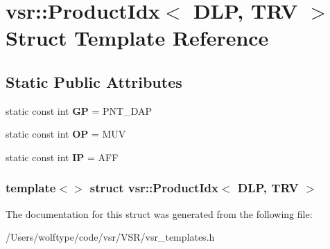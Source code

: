 \hypertarget{structvsr_1_1_product_idx_3_01_d_l_p_00_01_t_r_v_01_4}{\section{vsr\-:\-:Product\-Idx$<$ D\-L\-P, T\-R\-V $>$ Struct Template Reference}
\label{structvsr_1_1_product_idx_3_01_d_l_p_00_01_t_r_v_01_4}
}
\subsection*{Static Public Attributes}
\begin{DoxyCompactItemize}
\item 
\hypertarget{structvsr_1_1_product_idx_3_01_d_l_p_00_01_t_r_v_01_4_a625d8ec87ab1f61bd43a170fb36790f7}{static const int {\bfseries G\-P} = P\-N\-T\-\_\-\-D\-A\-P}\label{structvsr_1_1_product_idx_3_01_d_l_p_00_01_t_r_v_01_4_a625d8ec87ab1f61bd43a170fb36790f7}

\item 
\hypertarget{structvsr_1_1_product_idx_3_01_d_l_p_00_01_t_r_v_01_4_a85701ea0d1d13f738f208400206a5db9}{static const int {\bfseries O\-P} = M\-U\-V}\label{structvsr_1_1_product_idx_3_01_d_l_p_00_01_t_r_v_01_4_a85701ea0d1d13f738f208400206a5db9}

\item 
\hypertarget{structvsr_1_1_product_idx_3_01_d_l_p_00_01_t_r_v_01_4_a4c49d328ba75980572a6e1e6685618b3}{static const int {\bfseries I\-P} = A\-F\-F}\label{structvsr_1_1_product_idx_3_01_d_l_p_00_01_t_r_v_01_4_a4c49d328ba75980572a6e1e6685618b3}

\end{DoxyCompactItemize}
\subsubsection*{template$<$$>$ struct vsr\-::\-Product\-Idx$<$ D\-L\-P, T\-R\-V $>$}



The documentation for this struct was generated from the following file\-:\begin{DoxyCompactItemize}
\item 
/\-Users/wolftype/code/vsr/\-V\-S\-R/vsr\-\_\-templates.\-h\end{DoxyCompactItemize}
